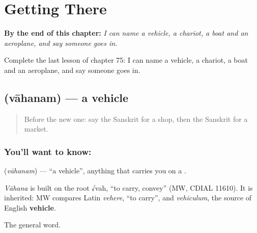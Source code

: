 
\chapter{Getting There}
\label{ch:sa-getting-there}

\begin{chapteropening}
\textbf{By the end of this chapter:} \emph{I can name a vehicle, a chariot, a boat and an aeroplane, and say someone goes in.}

Complete the last lesson of chapter 75: I can name a vehicle, a chariot, a boat and an aeroplane, and say someone goes in.
\end{chapteropening}

\section[\texorpdfstring{\sk{वाहनम्} (vāhanam)}{वाहनम् (vāhanam)}]{ (vāhanam) — a vehicle}

\label{lesson:SA-C75-vehicle}



\begin{quote}
Before the new one: say the Sanskrit for a shop, then the Sanskrit for a market.
\end{quote}

\subsection*{You'll want to know: }
\textbf{} (\emph{vāhanam}) — \textquotedblleft{}a vehicle\textquotedblright{}, anything that carries you on a \textbf{}.

\begin{cousinweb}
\emph{Vāhana} is built on the root √vah, \textquotedblleft{}to carry, convey\textquotedblright{} (MW, CDIAL 11610). It is inherited: MW compares Latin \emph{vehere}, \textquotedblleft{}to carry\textquotedblright{}, and \emph{vehiculum}, the source of English \textbf{vehicle}.
\end{cousinweb}

\begin{grammarlens}[title={What you've built}]
The general word.
\end{grammarlens}

